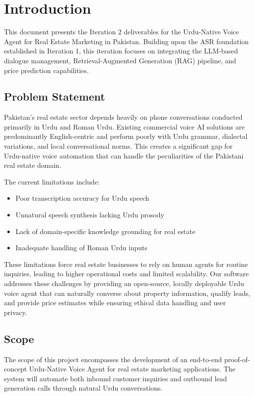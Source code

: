 \chapter{Introduction}
\label{ch:introduction}

This document presents the Iteration 2 deliverables for the Urdu-Native Voice Agent for Real Estate Marketing in Pakistan. Building upon the ASR foundation established in Iteration 1, this iteration focuses on integrating the LLM-based dialogue management, Retrieval-Augmented Generation (RAG) pipeline, and price prediction capabilities.

\section{Problem Statement}

Pakistan's real estate sector depends heavily on phone conversations conducted primarily in Urdu and Roman Urdu. Existing commercial voice AI solutions are predominantly English-centric and perform poorly with Urdu grammar, dialectal variations, and local conversational norms. This creates a significant gap for Urdu-native voice automation that can handle the peculiarities of the Pakistani real estate domain.

The current limitations include:
\begin{itemize}
    \item Poor transcription accuracy for Urdu speech
    \item Unnatural speech synthesis lacking Urdu prosody
    \item Lack of domain-specific knowledge grounding for real estate
    \item Inadequate handling of Roman Urdu inputs
\end{itemize}

These limitations force real estate businesses to rely on human agents for routine inquiries, leading to higher operational costs and limited scalability. Our software addresses these challenges by providing an open-source, locally deployable Urdu voice agent that can naturally converse about property information, qualify leads, and provide price estimates while ensuring ethical data handling and user privacy.

\section{Scope}

The scope of this project encompasses the development of an end-to-end proof-of-concept Urdu-Native Voice Agent for real estate marketing applications. The system will automate both inbound customer inquiries and outbound lead generation calls through natural Urdu conversations.

